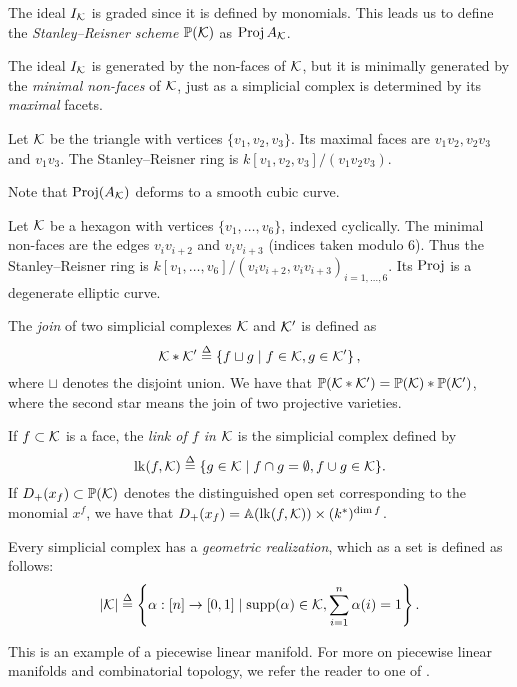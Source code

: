 The ideal $I_{\mathcal{K}}$ is graded since it is defined by monomials. This leads us to define the \emph{Stanley--Reisner scheme} $\mathbb{P}(\mathcal{K})$ as $\operatorname{Proj} A_{\mathcal{K}}$. 

\begin{remark}
The ideal $I_{\mathcal{K}}$ is generated by the non-faces of $\mathcal{K}$, but it is minimally generated by the \emph{minimal non-faces} of $\mathcal{K}$, just as a simplicial complex is determined by its \emph{maximal} facets.
\end{remark}

\begin{example}
Let $\mathcal{K}$ be the triangle with vertices $\{ v_1,v_2,v_3\}$. Its maximal faces are $v_1v_2, v_2v_3$ and $v_1v_3$. The Stanley--Reisner ring is $k[v_1,v_2,v_3]/(v_1v_2v_3)$.

Note that $\operatorname{Proj}(A_{\mathcal{K}})$ deforms to a smooth cubic curve.
\end{example}

\begin{example}
Let $\mathcal{K}$ be a hexagon with vertices $\{v_1,\ldots,v_6 \}$, indexed cyclically. The minimal non-faces are the edges $v_iv_{i+2}$ and $v_iv_{i+3}$ (indices taken modulo $6$). Thus the Stanley--Reisner ring is $k[v_1,\ldots,v_6]/\left(v_iv_{i+2},v_iv_{i+3}\right)_{i=1,\ldots,6}$. Its $\operatorname{Proj}$  is a degenerate elliptic curve.
\end{example}

The \emph{join} of two simplicial complexes $\mathcal{K}$ and $\mathcal{K}'$ is defined as
$$
\mathcal{K} \ast \mathcal{K}' \stackrel{\Delta}{=} \left\{ f \sqcup g \mid f \in \mathcal{K}, g \in \mathcal{K}' \right\},
$$
where $\sqcup$ denotes the disjoint union. We have that $\mathbb{P}(\mathcal{K} \ast \mathcal{K}') = \mathbb{P}(\mathcal{K}) \ast \mathbb{P}(\mathcal{K}')$, where the second star means the join of two projective varieties.

If $f \subset \mathcal{K}$ is a face, the \emph{link of $f$ in $\mathcal{K}$} is the simplicial complex defined by
$$
\mathrm{lk}(f,\mathcal{K}) \stackrel{\Delta}{=} \{ g \in \mathcal{K} \mid f \cap g = \emptyset, f \cup g \in \mathcal{K} \}.
$$
If $D_+(x_f) \subset \mathbb{P}(\mathcal{K})$ denotes the distinguished open set corresponding to the monomial $x^f$, we have that $D_+(x_f) = \mathbb{A}(\mathrm{lk}(f,\mathcal{K})) \times (k^\ast)^{\dim f}$. 

Every simplicial complex has a \emph{geometric realization}, which as a set is defined as follows:
$$
|\mathcal{K}| \stackrel{\Delta}{=} \left\{ \alpha: [n] \to [0,1] \mid \operatorname{{supp}}(\alpha) \in \mathcal{K}, \sum_{i=1}^n \alpha(i) = 1 \right\}.
$$

This is an example of a piecewise linear manifold. For more on piecewise linear manifolds and combinatorial topology, we refer the reader to one of \cite{glaser_combtop,spanier_topology,hudson_pl}.

